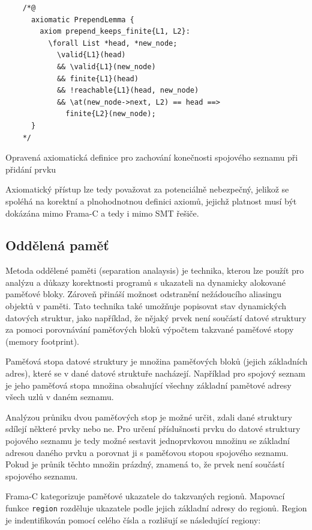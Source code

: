 \begin{listing}[H]
    \begin{verbatim}
    /*@
      axiomatic PrependLemma {
        axiom prepend_keeps_finite{L1, L2}:
          \forall List *head, *new_node;
            \valid{L1}(head)
            && \valid{L1}(new_node)
            && finite{L1}(head)
            && !reachable{L1}(head, new_node)
            && \at(new_node->next, L2) == head ==>
              finite{L2}(new_node);
      }
    */
    \end{verbatim}
    \caption{Opravená axiomatická definice pro zachování konečnosti spojového seznamu při přidání prvku}
    \label{list:linked-list-axiom-prepend-fixed}
\end{listing}

Axiomatický přístup lze tedy považovat za potenciálně nebezpečný,
jelikož se spoléhá na korektní a plnohodnotnou definici axiomů,
jejichž platnost musí být dokázána mimo Frama\mbox{-}C a tedy i mimo SMT řešiče.

\subsection{Oddělená paměť}
\label{subsec:oddelena-pamet}

Metoda oddělené paměti (separation analaysis) je technika,
kterou lze použít pro analýzu a důkazy korektnosti programů
s ukazateli na dynamicky alokované paměťové bloky.
Zároveň přináší možnost odstranění nežádoucího aliasingu
objektů v paměti.
Tato technika také umožňuje popisovat stav dynamických datových struktur,
jako například, že nějaký prvek není součástí datové struktury
za pomoci porovnávání paměťových bloků výpočtem takzvané paměťové stopy (memory footprint).

Paměťová stopa datové struktury je množina paměťových bloků (jejich základních adres),
které se v dané datové struktuře nacházejí.
Například pro spojový seznam je jeho paměťová stopa množina
obsahující všechny základní pamětové adresy všech uzlů v daném seznamu.

Analýzou průniku dvou paměťových stop je možné určit,
zdali dané struktury sdílejí některé prvky nebo ne.
Pro určení příslušnosti prvku do datové struktury pojového seznamu
je tedy možné sestavit jednoprvkovou množinu se základní adresou daného prvku
a porovnat ji s paměťovou stopou spojového seznamu.
Pokud je průnik těchto množin prázdný,
znamená to, že prvek není součástí spojového seznamu.

Frama\mbox{-}C kategorizuje paměťové ukazatele do takzvaných regionů.
Mapovací funkce \texttt{region} rozděluje ukazatele podle jejich základní adresy do regionů.
Region je indentifikován pomocí celého čísla a rozlišují se následující regiony:

